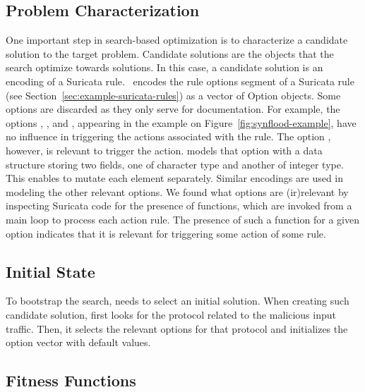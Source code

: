 \documentclass[runningheads]{llncs}
\begin{document}
\subsection{Problem Characterization}

One important step in search-based optimization is to characterize a
candidate solution to the target problem. Candidate solutions are the
objects that the search optimize towards solutions. In this case, a 
candidate solution is an encoding of a Suricata rule.  \tname\ encodes
the rule options segment of a Suricata rule (see
Section~\ref{sec:example-suricata-rules}) as a vector of Option
objects. Some options are discarded as they only serve for
documentation. For example, the options ,
, and , appearing in the
example on Figure~\ref{fig:synflood-example}, have no influence in
triggering the actions associated with the rule. The option
, however, is relevant to trigger the action. \tname{}
models that option with a data structure storing two fields, one of
character type and another of integer type. This enables \tname{} to
mutate each element separately. Similar encodings are used in modeling
the other relevant options. We found what options are (ir)relevant by
inspecting Suricata code for the presence of  functions,
which are invoked from a main loop to process each action rule. The
presence of such a function for a given option indicates that it is
relevant for triggering some action of some rule.

\subsection{Initial State}

To bootstrap the search, \tname{} needs to select an initial
solution. When creating such candidate solution, \tname{} first looks
for the protocol related to the malicious input traffic. Then, it
selects the relevant options for that protocol and initializes the
option vector with default values. 


\subsection{Fitness Functions}
\end{document}
